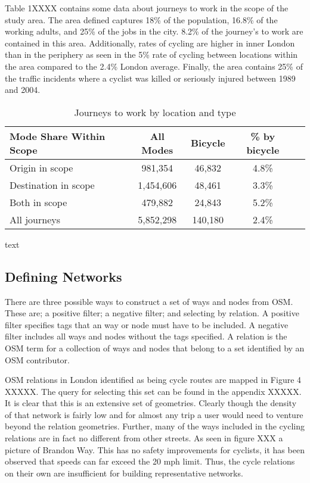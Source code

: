 Table 1XXXX contains some data about journeys to work in the scope of the study area. The area defined captures 18\% of the population, 16.8\% of the working adults, and 25\% of the jobs in the city. 8.2\% of the journey's to work are contained in this area. Additionally, rates of cycling are higher in inner London than in the periphery as seen in the 5\% rate of cycling between locations within the area compared to the 2.4\% London average. Finally, the area contains 25\% of the traffic incidents where a cyclist was killed or seriously injured between 1989 and 2004. 
 
\begin{table}[]
\centering
\begin{tabular}{lcccl}
 Mode Share Within Scope & All Modes & Bicycle & \% by bicycle &  \\
 \hline
 Origin in scope &  981,354 & 46,832 & 4.8\% &  \\
 Destination in scope & 1,454,606 & 48,461 & 3.3\% &  \\
 Both in scope & 479,882 & 24,843 & 5.2\% & \\
 All journeys & 5,852,298 & 140,180 & 2.4\% \\ 
\end{tabular}
\caption{Journeys to work by location and type}
\label{table:commute_data}
\end{table}

text

\subsection{Defining Networks}

There are three possible ways to construct a set of ways and nodes from OSM. These are; a positive filter; a negative filter; and selecting by relation. A positive filter specifies tags that an way or node must have to be included. A negative filter includes all ways and nodes without the tags specified. A relation is the OSM term for a collection of ways and nodes that belong to a set identified by an OSM contributor. 

OSM relations in London identified as being cycle routes are mapped in Figure 4 XXXXX. The query for selecting this set can be found in the appendix XXXXX. It is clear that this is an extensive set of geometries. Clearly though the density of that network is fairly low and for almost any trip a user would need to venture beyond the relation geometries. Further, many of the ways included in the cycling relations are in fact no different from other streets. As seen in figure XXX a picture of Brandon Way. This has no safety improvements for cyclists, it has been observed that speeds can far exceed the 20 mph limit. Thus, the cycle relations on their own are insufficient for building representative networks. 

